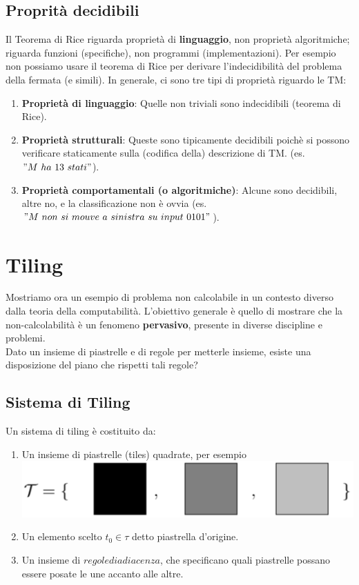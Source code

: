 \documentclass[a4paper, 12pt]{article}
\begin{document}
\subsection{Proprit\`a decidibili}
Il Teorema di Rice riguarda propriet\`a di \textbf{linguaggio}, non propriet\`a algoritmiche; riguarda funzioni (specifiche), non programmi (implementazioni). Per esempio non possiamo usare il teorema di Rice per derivare l'indecidibilit\`a del problema della fermata (e simili).
In generale, ci sono tre tipi di propriet\`a riguardo le TM:
\begin{enumerate}
\item \textbf{Propriet\`a di linguaggio}: Quelle non triviali sono indecidibili (teorema di Rice).
\item \textbf{Propriet\`a strutturali}: Queste sono tipicamente decidibili poich\`e si possono verificare staticamente sulla (codifica della) descrizione di TM. (es. $"M\ ha\ 13\ stati"$).
\item \textbf{Propriet\`a comportamentali (o algoritmiche)}: Alcune sono decidibili, altre no, e la classificazione non \`e ovvia (es. $"M\ non\ si\ mouve\ a\ sinistra\ su\ input\ 0101"$).
\end{enumerate}
\newpage
\section{Tiling}
Mostriamo ora un esempio di problema non calcolabile in un contesto diverso dalla teoria della computabilit\`a. L'obiettivo generale \`e quello di mostrare che la non-calcolabilit\`a \`e un fenomeno \textbf{pervasivo}, presente in diverse discipline e problemi.\\
Dato un insieme di piastrelle e di regole per metterle insieme, esiste una disposizione del piano che rispetti tali regole?
\subsection{Sistema di Tiling}
Un sistema di tiling \`e costituito da:
\begin{enumerate}
\item Un insieme di piastrelle (tiles) quadrate, per esempio\\
\includegraphics[scale=0.5]{tiling1.png}
\item Un elemento scelto $t_0 \in \tau $ detto piastrella d'origine.
\item Un insieme di $regole di adiacenza$, che specificano quali piastrelle possano essere posate le une accanto alle altre.
\end{enumerate}
\end{document}
